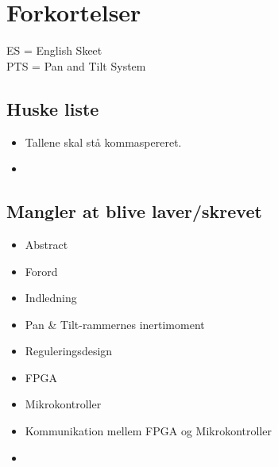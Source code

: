 \section*{Forkortelser}

ES = English Skeet \\
PTS = Pan and Tilt System

\subsection*{Huske liste}
\begin{itemize}
\item Tallene skal stå kommaspereret.
\item {}
\end{itemize}



\subsection*{Mangler at blive laver/skrevet}
\begin{itemize}
\item Abstract
\item Forord
\item Indledning
\item Pan \& Tilt-rammernes inertimoment
\item Reguleringsdesign
\item FPGA
\item Mikrokontroller
\item Kommunikation mellem FPGA og Mikrokontroller
\item 
\listoftodos

\end{itemize}